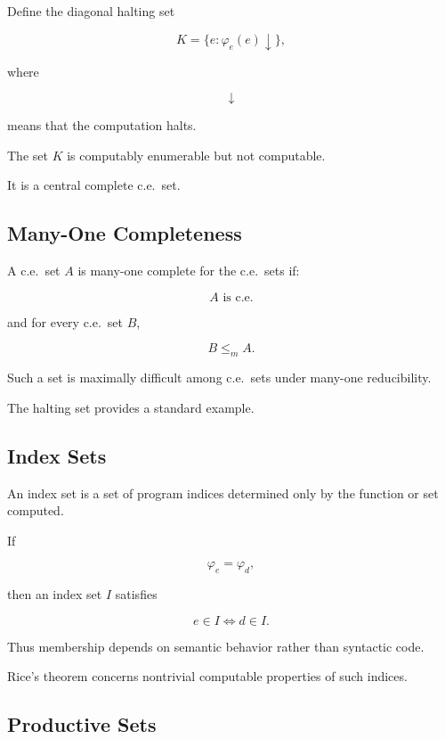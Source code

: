Define the diagonal halting set

\[
\boxed{
K
=
\{
e:
\varphi_e(e)
\downarrow
\},
}
\]

where

\[
\downarrow
\]

means that the computation halts.

The set \(K\) is computably enumerable but not computable.

It is a central complete c.e.\ set.

\subsection{Many-One Completeness}
\label{subsec:ce-many-one-completeness}

A c.e.\ set \(A\) is many-one complete for the c.e.\ sets if:

\[
A
\text{ is c.e.}
\]

and for every c.e.\ set \(B\),

\[
\boxed{
B
\leq_m
A.
}
\]

Such a set is maximally difficult among c.e.\ sets under many-one
reducibility.

The halting set provides a standard example.

\subsection{Index Sets}
\label{subsec:index-sets}

An index set is a set of program indices determined only by the function or
set computed.

If

\[
\varphi_e
=
\varphi_d,
\]

then an index set \(I\) satisfies

\[
\boxed{
e\in I
\iff
d\in I.
}
\]

Thus membership depends on semantic behavior rather than syntactic code.

Rice's theorem concerns nontrivial computable properties of such indices.

\subsection{Productive Sets}
\label{subsec:productive-sets}

